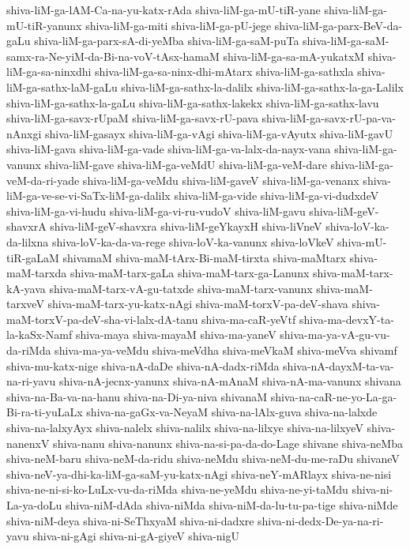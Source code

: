 {shiva-liM-ga-lAM-Ca-na-yu-katx-rAda
shiva-liM-ga-mU-tiR-yane
shiva-liM-ga-mU-tiR-yanunx
shiva-liM-ga-miti
shiva-liM-ga-pU-jege
shiva-liM-ga-parx-BeV-da-gaLu
shiva-liM-ga-parx-sA-di-yeMba
shiva-liM-ga-saM-puTa
shiva-liM-ga-saM-samx-ra-Ne-yiM-da-Bi-na-voV-tAsx-hamaM
shiva-liM-ga-sa-mA-yukatxM
shiva-liM-ga-sa-ninxdhi
shiva-liM-ga-sa-ninx-dhi-mAtarx
shiva-liM-ga-sathxla
shiva-liM-ga-sathx-laM-gaLu
shiva-liM-ga-sathx-la-dalilx
shiva-liM-ga-sathx-la-ga-Lalilx
shiva-liM-ga-sathx-la-gaLu
shiva-liM-ga-sathx-lakekx
shiva-liM-ga-sathx-lavu
shiva-liM-ga-savx-rUpaM
shiva-liM-ga-savx-rU-pava
shiva-liM-ga-savx-rU-pa-va-nAnxgi
shiva-liM-gasayx
shiva-liM-ga-vAgi
shiva-liM-ga-vAyutx
shiva-liM-gavU
shiva-liM-gava
shiva-liM-ga-vade
shiva-liM-ga-va-lalx-da-nayx-vana
shiva-liM-ga-vanunx
shiva-liM-gave
shiva-liM-ga-veMdU
shiva-liM-ga-veM-dare
shiva-liM-ga-veM-da-ri-yade
shiva-liM-ga-veMdu
shiva-liM-gaveV
shiva-liM-ga-venanx
shiva-liM-ga-ve-se-vi-SaTx-liM-ga-dalilx
shiva-liM-ga-vide
shiva-liM-ga-vi-dudxdeV
shiva-liM-ga-vi-hudu
shiva-liM-ga-vi-ru-vudoV
shiva-liM-gavu
shiva-liM-geV-shavxrA
shiva-liM-geV-shavxra
shiva-liM-geYkayxH
shiva-liVneV
shiva-loV-ka-da-lilxna
shiva-loV-ka-da-va-rege
shiva-loV-ka-vanunx
shiva-loVkeV
shiva-mU-tiR-gaLaM
shivamaM
shiva-maM-tArx-Bi-maM-tirxta
shiva-maMtarx
shiva-maM-tarxda
shiva-maM-tarx-gaLa
shiva-maM-tarx-ga-Lanunx
shiva-maM-tarx-kA-yava
shiva-maM-tarx-vA-gu-tatxde
shiva-maM-tarx-vanunx
shiva-maM-tarxveV
shiva-maM-tarx-yu-katx-nAgi
shiva-maM-torxV-pa-deV-shava
shiva-maM-torxV-pa-deV-sha-vi-lalx-dA-tanu
shiva-ma-caR-yeVtf
shiva-ma-devxY-ta-la-kaSx-Namf
shiva-maya
shiva-mayaM
shiva-ma-yaneV
shiva-ma-ya-vA-gu-vu-da-riMda
shiva-ma-ya-veMdu
shiva-meVdha
shiva-meVkaM
shiva-meVva
shivamf
shiva-mu-katx-nige
shiva-nA-daDe
shiva-nA-dadx-riMda
shiva-nA-dayxM-ta-va-na-ri-yavu
shiva-nA-jecnx-yanunx
shiva-nA-mAnaM
shiva-nA-ma-vanunx
shivana
shiva-na-Ba-va-na-hanu
shiva-na-Di-ya-niva
shivanaM
shiva-na-caR-ne-yo-La-ga-Bi-ra-ti-yuLaLx
shiva-na-gaGx-va-NeyaM
shiva-na-lAlx-guva
shiva-na-lalxde
shiva-na-lalxyAyx
shiva-nalelx
shiva-nalilx
shiva-na-lilxye
shiva-na-lilxyeV
shiva-nanenxV
shiva-nanu
shiva-nanunx
shiva-na-si-pa-da-do-Lage
shivane
shiva-neMba
shiva-neM-baru
shiva-neM-da-ridu
shiva-neMdu
shiva-neM-du-me-raDu
shivaneV
shiva-neV-ya-dhi-ka-liM-ga-saM-yu-katx-nAgi
shiva-neY-mARlayx
shiva-ne-nisi
shiva-ne-ni-si-ko-LuLx-vu-da-riMda
shiva-ne-yeMdu
shiva-ne-yi-taMdu
shiva-ni-La-ya-doLu
shiva-niM-dAda
shiva-niMda
shiva-niM-da-lu-tu-pa-tige
shiva-niMde
shiva-niM-deya
shiva-ni-SeThxyaM
shiva-ni-dadxre
shiva-ni-dedx-De-ya-na-ri-yavu
shiva-ni-gAgi
shiva-ni-gA-giyeV
shiva-nigU
}
